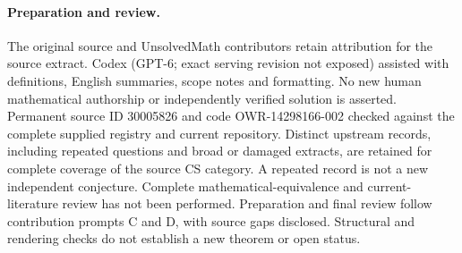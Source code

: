 \documentclass[11pt]{article}
\begin{document}
\paragraph{Preparation and review.}
The original source and UnsolvedMath contributors retain attribution for the source extract. Codex (GPT-6; exact serving revision not exposed) assisted with definitions, English summaries, scope notes and formatting. No new human mathematical authorship or independently verified solution is asserted. Permanent source ID 30005826 and code OWR-14298166-002 checked against the complete supplied registry and current repository. Distinct upstream records, including repeated questions and broad or damaged extracts, are retained for complete coverage of the source CS category. A repeated record is not a new independent conjecture. Complete mathematical-equivalence and current-literature review has not been performed. Preparation and final review follow contribution prompts C and D, with source gaps disclosed. Structural and rendering checks do not establish a new theorem or open status.
\label{end:30005826}
\end{document}
